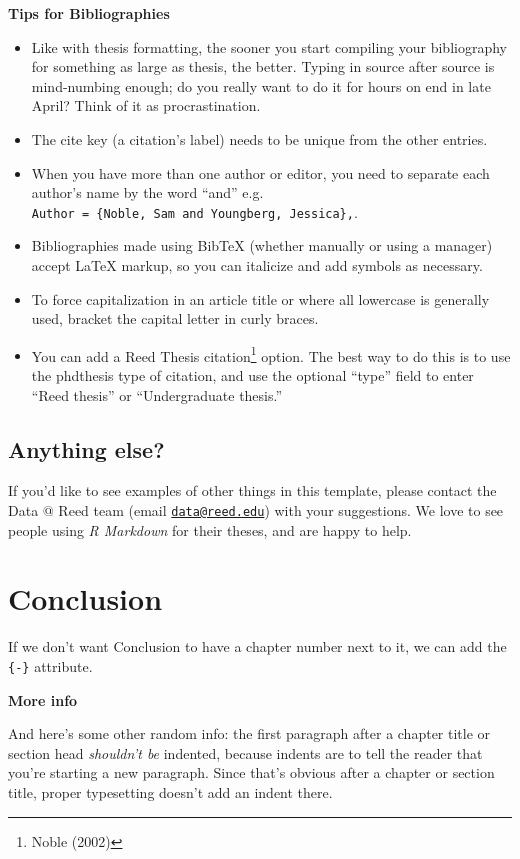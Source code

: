 \documentclass[12pt,twoside]{reedthesis}
\providecommand{\tightlist}{%
  \setlength{\itemsep}{0pt}\setlength{\parskip}{0pt}}
\begin{document}
\textbf{Tips for Bibliographies}
\begin{itemize}
\tightlist
\item
  Like with thesis formatting, the sooner you start compiling your bibliography for something as large as thesis, the better. Typing in source after source is mind-numbing enough; do you really want to do it for hours on end in late April? Think of it as procrastination.
\item
  The cite key (a citation's label) needs to be unique from the other entries.
\item
  When you have more than one author or editor, you need to separate each author's name by the word ``and'' e.g. \texttt{Author\ =\ \{Noble,\ Sam\ and\ Youngberg,\ Jessica\},}.
\item
  Bibliographies made using BibTeX (whether manually or using a manager) accept LaTeX markup, so you can italicize and add symbols as necessary.
\item
  To force capitalization in an article title or where all lowercase is generally used, bracket the capital letter in curly braces.
\item
  You can add a Reed Thesis citation\footnote{Noble (2002)} option. The best way to do this is to use the phdthesis type of citation, and use the optional ``type'' field to enter ``Reed thesis'' or ``Undergraduate thesis.''
\end{itemize}
\hypertarget{anything-else}{%
\section{Anything else?}\label{anything-else}}

If you'd like to see examples of other things in this template, please contact the Data @ Reed team (email \href{mailto:data@reed.edu}{\nolinkurl{data@reed.edu}}) with your suggestions. We love to see people using \emph{R Markdown} for their theses, and are happy to help.

\hypertarget{conclusion}{%
\chapter*{Conclusion}\label{conclusion}}

If we don't want Conclusion to have a chapter number next to it, we can add the \texttt{\{-\}} attribute.

\textbf{More info}

And here's some other random info: the first paragraph after a chapter title or section head \emph{shouldn't be} indented, because indents are to tell the reader that you're starting a new paragraph. Since that's obvious after a chapter or section title, proper typesetting doesn't add an indent there.
\end{document}
